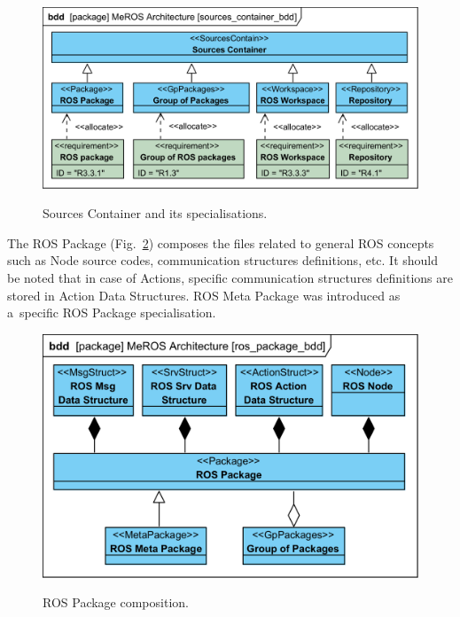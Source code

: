 \documentclass[11pt,oneside,a4paper]{report}
\begin{document}
	
	\begin{figure}[H]
		\centering
		\begin{center}
			{\includegraphics[scale=1.0]{diagrams/sources_container_bdd.png}}
		\end{center}
		\caption{Sources Container and its specialisations.} 
		\label{fig:sources_container_bdd}
	\end{figure}
	
	The ROS Package (Fig.~\ref{fig:ros_package_bdd}) composes the files related to general ROS concepts such as Node source codes, communication structures definitions, etc. It should be noted that in case of Actions, specific communication structures definitions are stored in Action Data Structures. ROS Meta Package was introduced as a~specific ROS Package specialisation.
	
	\begin{figure}[H]
		\centering
		\begin{center}
			{\includegraphics[scale=1.0]{diagrams/ros_package_bdd.png}}
		\end{center}
		\caption{ROS Package composition.} 
		\label{fig:ros_package_bdd}
	\end{figure}
		
\end{document}
